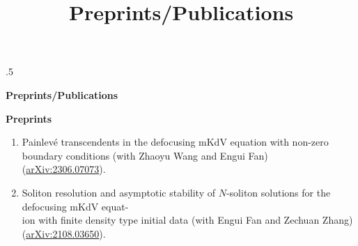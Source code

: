 \documentclass[letterpaper,11pt,UTF8]{article}
\title{Preprints/Publications}
\begin{document}


\moveleft.5\hoffset\centerline{\LARGE\bf Preprints/Publications} %
\center
\large\textbf{Preprints}
\begin{flushleft}
    \begin{enumerate}[1.]
   \item Painlev\'{e} transcendents in the defocusing mKdV equation with non-zero boundary conditions (with Zhaoyu Wang and Engui Fan)\\
    (\href{https://arxiv.org/abs/2306.07073}{arXiv:2306.07073}).
    \vspace{1.5mm}

    \item Soliton resolution and asymptotic stability of $N$-soliton solutions for the defocusing mKdV equat-\\ion with finite density type initial data (with Engui Fan and Zechuan Zhang)\\ 
    (\href{https://arxiv.org/abs/2108.03650}{arXiv:2108.03650}).    
    \end{enumerate}
\end{flushleft}
\vspace{3mm}
\end{document}
